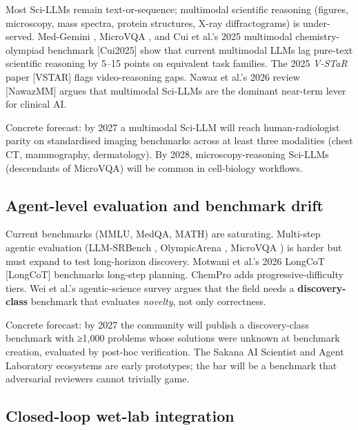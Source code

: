 \documentclass{article}
\begin{document}
Most Sci-LLMs remain text-or-sequence; multimodal scientific reasoning (figures, microscopy, mass spectra, protein structures, X-ray diffractograms) is under-served. Med-Gemini \cite{yang2024advancingmultimoda}, MicroVQA \cite{burgess2023microvqaamultimoda}, and Cui et al.'s 2025 multimodal chemistry-olympiad benchmark {[}Cui2025{]} show that current multimodal LLMs lag pure-text scientific reasoning by 5--15 points on equivalent task families. The 2025 \emph{V-STaR} paper {[}VSTAR{]} flags video-reasoning gaps. Nawaz et al.'s 2026 review {[}NawazMM{]} argues that multimodal Sci-LLMs are the dominant near-term lever for clinical AI.

Concrete forecast: by 2027 a multimodal Sci-LLM will reach human-radiologist parity on standardised imaging benchmarks across at least three modalities (chest CT, mammography, dermatology). By 2028, microscopy-reasoning Sci-LLMs (descendants of MicroVQA) will be common in cell-biology workflows.

\subsection{Agent-level evaluation and benchmark drift}\label{agent-level-evaluation-and-benchmark-drift}

Current benchmarks (MMLU, MedQA, MATH) are saturating. Multi-step agentic evaluation (LLM-SRBench \cite{shojaee2025llmsrbenchanewbenc}, OlympicArena \cite{huang2024olympicarenabenchm}, MicroVQA \cite{burgess2023microvqaamultimoda}) is harder but must expand to test long-horizon discovery. Motwani et al.'s 2026 LongCoT {[}LongCoT{]} benchmarks long-step planning. ChemPro \cite{baranwal2026arxiv2602031082026} adds progressive-difficulty tiers. Wei et al.'s agentic-science survey \cite{wei2025fromaiforscienceto} argues that the field needs a \textbf{discovery-class} benchmark that evaluates \emph{novelty}, not only correctness.

Concrete forecast: by 2027 the community will publish a discovery-class benchmark with ≥1,000 problems whose solutions were unknown at benchmark creation, evaluated by post-hoc verification. The Sakana AI Scientist and Agent Laboratory ecosystems are early prototypes; the bar will be a benchmark that adversarial reviewers cannot trivially game.

\subsection{Closed-loop wet-lab integration}\label{closed-loop-wet-lab-integration}
\end{document}
